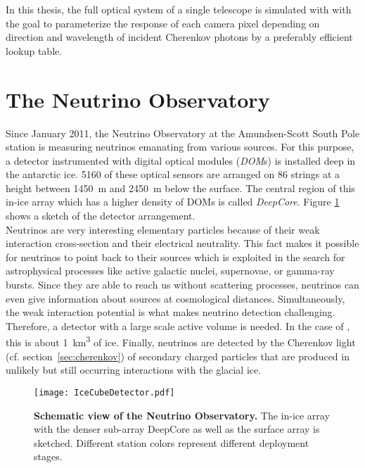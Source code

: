 In this thesis, the full optical system of a single \iceact telescope is simulated with \geant with the goal to parameterize the response of each camera pixel depending on direction and wavelength of incident Cherenkov photons by a preferably efficient lookup table.

\section{The \icecube Neutrino Observatory}

Since January 2011, the \icecube Neutrino Observatory at the Amundsen-Scott South Pole station is measuring neutrinos emanating from various sources. For this purpose, a detector instrumented with digital optical modules (\textit{DOM}s) is installed deep in the antarctic ice. 5160 of these optical sensors are arranged on 86 strings at a height between \SI{1450}{\meter} and \SI{2450}{\meter} below the surface. The central region of this in-ice array which has a higher density of DOMs is called \textit{DeepCore}. Figure \ref{icecube:detector} shows a sketch of the detector arrangement.\\

Neutrinos are very interesting elementary particles because of their weak interaction cross-section and their electrical neutrality. This fact makes it possible for neutrinos to point back to their sources which is exploited in the search for astrophysical processes like active galactic nuclei, supernovae, or gamma-ray bursts. Since they are able to reach us without scattering processes, neutrinos can even give information about sources at cosmological distances. Simultaneously, the weak interaction potential is what makes neutrino detection challenging. Therefore, a detector with a large scale active volume is needed. In the case of \icecube, this is about \SI{1}{\cubic\kilo\meter} of ice. Finally, neutrinos are detected by the Cherenkov light (cf. section~\ref{sec:cherenkov}) of secondary charged particles that are produced in unlikely but still occurring interactions with the glacial ice.\\

\begin{figure}[H]
	\texttt{[image: IceCubeDetector.pdf]}
	\caption[Schematic view of \icecube]{\textbf{Schematic view of the \icecube Neutrino Observatory.} \cite{icecube:instrumentation} The in-ice array with the denser sub-array DeepCore as well as the surface array \icetop is sketched. Different station colors represent different deployment stages.}
	\label{icecube:detector}
\end{figure}


